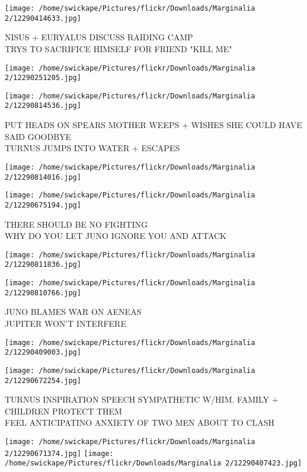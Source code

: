 \documentclass[10pt,letterpaper]{article}
\begin{document}
\vspace{0.25in}
\texttt{[image: /home/swickape/Pictures/flickr/Downloads/Marginalia 2/12290414633.jpg]}

NISUS + EURYALUS DISCUSS RAIDING CAMP\\
TRYS TO SACRIFICE HIMSELF FOR FRIEND "KILL ME"
\pagebreak

\texttt{[image: /home/swickape/Pictures/flickr/Downloads/Marginalia 2/12290251205.jpg]}

\vspace{0.25in}
\texttt{[image: /home/swickape/Pictures/flickr/Downloads/Marginalia 2/12290814536.jpg]}

PUT HEADS ON SPEARS MOTHER WEEPS + WISHES SHE COULD HAVE SAID GOODBYE\\
TURNUS JUMPS INTO WATER + ESCAPES
\pagebreak

\texttt{[image: /home/swickape/Pictures/flickr/Downloads/Marginalia 2/12290814016.jpg]}

\vspace{0.25in}
\texttt{[image: /home/swickape/Pictures/flickr/Downloads/Marginalia 2/12290675194.jpg]}

THERE SHOULD BE NO FIGHTING\\
WHY DO YOU LET JUNO IGNORE YOU AND ATTACK
\pagebreak

\texttt{[image: /home/swickape/Pictures/flickr/Downloads/Marginalia 2/12290811836.jpg]}

\vspace{0.25in}
\texttt{[image: /home/swickape/Pictures/flickr/Downloads/Marginalia 2/12290810766.jpg]}

JUNO BLAMES WAR ON AENEAS\\
JUPITER WON'T INTERFERE
\pagebreak

\texttt{[image: /home/swickape/Pictures/flickr/Downloads/Marginalia 2/12290409003.jpg]}

\vspace{0.25in}
\texttt{[image: /home/swickape/Pictures/flickr/Downloads/Marginalia 2/12290672254.jpg]}

TURNUS INSPIRATION SPEECH SYMPATHETIC W/HIM. FAMILY + CHILDREN PROTECT THEM\\
FEEL ANTICIPATINO ANXIETY OF TWO MEN ABOUT TO CLASH
\pagebreak

\texttt{[image: /home/swickape/Pictures/flickr/Downloads/Marginalia 2/12290671374.jpg]}
\texttt{[image: /home/swickape/Pictures/flickr/Downloads/Marginalia 2/12290407423.jpg]}
\end{document}
